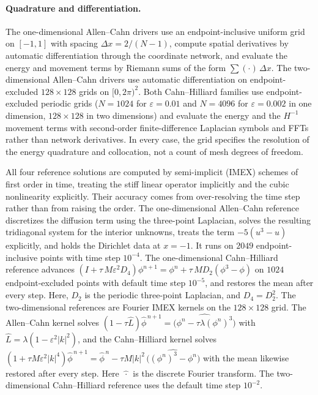 \documentclass[11pt,letterpaper]{article}
\theoremstyle{plain}
\theoremstyle{definition}
\begin{document}
\paragraph{Quadrature and differentiation.} The one-dimensional Allen--Cahn drivers use an endpoint-inclusive uniform grid on $[-1,1]$ with spacing $\Delta x = 2/(N-1)$, compute spatial derivatives by automatic differentiation through the coordinate network, and evaluate the energy and movement terms by Riemann sums of the form $\sum(\cdot)\,\Delta x$. The two-dimensional Allen--Cahn drivers use automatic differentiation on endpoint-excluded $128\times128$ grids on $[0,2\pi)^2$. Both Cahn--Hilliard families use endpoint-excluded periodic grids ($N=1024$ for $\varepsilon=0.01$ and $N=4096$ for $\varepsilon=0.002$ in one dimension, $128\times128$ in two dimensions) and evaluate the energy and the $H^{-1}$ movement terms with second-order finite-difference Laplacian symbols and FFTs rather than network derivatives. In every case, the grid specifies the resolution of the energy quadrature and collocation, not a count of mesh degrees of freedom.

All four reference solutions are computed by semi-implicit (IMEX) schemes of first order in time, treating the stiff linear operator implicitly and the cubic nonlinearity explicitly. Their accuracy comes from over-resolving the time step rather than from raising the order. The one-dimensional Allen--Cahn reference discretizes the diffusion term using the three-point Laplacian, solves the resulting tridiagonal system for the interior unknowns, treats the term $-5(u^3-u)$ explicitly, and holds the Dirichlet data at $ x=-1$. It runs on $2049$ endpoint-inclusive points with time step $10^{-4}$. The one-dimensional Cahn--Hilliard reference advances $(I+\tau\,M\varepsilon^2 D_4)\phi^{n+1}=\phi^n+\tau\,M D_2(\phi^3-\phi)$ on $1024$ endpoint-excluded points with default time step $10^{-5}$, and restores the mean after every step. Here, $D_2$ is the periodic three-point Laplacian, and $ D_4 = D_2^2$. The two-dimensional references are Fourier IMEX kernels on the $128\times128$ grid. The Allen--Cahn kernel solves $(1-\tau\widehat{L})\widehat\phi^{\,n+1}=\widehat{\bigl(\phi^n-\tau\lambda(\phi^n)^3\bigr)}$ with $\widehat{L}=\lambda(1-\varepsilon^2|k|^2)$, and the Cahn--Hilliard kernel solves $(1+\tau M\varepsilon^2|k|^4)\widehat\phi^{\,n+1}=\widehat\phi^{\,n}-\tau M|k|^2\,\widehat{\bigl((\phi^n)^3-\phi^n\bigr)}$ with the mean likewise restored after every step. Here $\widehat{\,\cdot\,}$ is the discrete Fourier transform. The two-dimensional Cahn--Hilliard reference uses the default time step $10^{-2}$.
\end{document}
